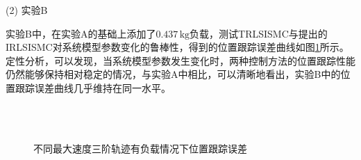 (2) 实验B

实验B中，在实验A的基础上添加了$0.437\,\text{kg}$负载，测试TRLSISMC与提出的IRLSISMC对系统模型参数变化的鲁棒性，得到的位置跟踪误差曲线如图\ref{不同最大速度三阶S轨迹有负载情况下位置跟踪误2}所示。定性分析，可以发现，当系统模型参数发生变化时，两种控制方法的位置跟踪性能仍然能够保持相对稳定的情况，与实验A中相比，可以清晰地看出，实验B中的位置跟踪误差曲线几乎维持在同一水平。

\begin{figure}[H]\centering
	\\
	\\
	\caption{不同最大速度三阶轨迹有负载情况下位置跟踪误差}\label{不同最大速度三阶S轨迹有负载情况下位置跟踪误2}
\end{figure}

